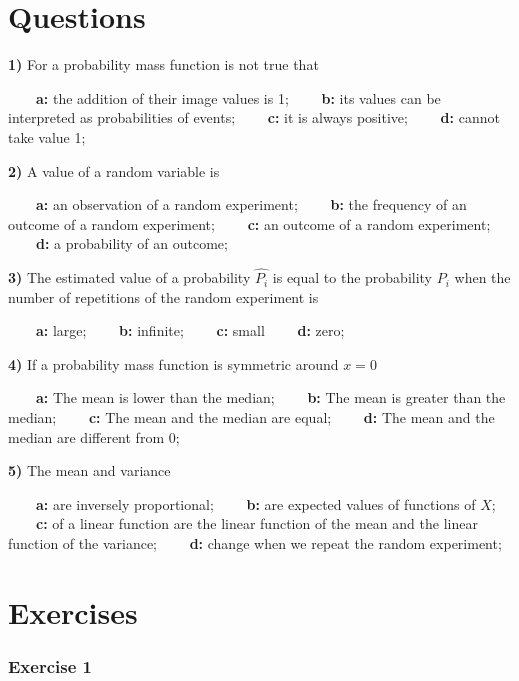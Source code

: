\documentclass[
]{book}
\begin{document}
\hypertarget{questions-3}{%
\section{Questions}\label{questions-3}}

\textbf{1)} For a probability mass function is not true that

\textbf{\(\qquad\)a:} the addition of their image values is 1; \textbf{\(\qquad\)b:} its values can be interpreted as probabilities of events;
\textbf{\(\qquad\)c:} it is always positive;
\textbf{\(\qquad\)d:} cannot take value 1;

\textbf{2)} A value of a random variable is

\textbf{\(\qquad\)a:} an observation of a random experiment; \textbf{\(\qquad\)b:} the frequency of an outcome of a random experiment;
\textbf{\(\qquad\)c:} an outcome of a random experiment;
\textbf{\(\qquad\)d:} a probability of an outcome;

\textbf{3)} The estimated value of a probability \(\hat{P_i}\) is equal to the probability \(P_i\) when the number of repetitions of the random experiment is

\textbf{\(\qquad\)a:} large; \textbf{\(\qquad\)b:} infinite;
\textbf{\(\qquad\)c:} small
\textbf{\(\qquad\)d:} zero;

\textbf{4)} If a probability mass function is symmetric around \(x=0\)

\textbf{\(\qquad\)a:} The mean is lower than the median; \textbf{\(\qquad\)b:} The mean is greater than the median;
\textbf{\(\qquad\)c:} The mean and the median are equal;
\textbf{\(\qquad\)d:} The mean and the median are different from 0;

\textbf{5)} The mean and variance

\textbf{\(\qquad\)a:} are inversely proportional; \textbf{\(\qquad\)b:} are expected values of functions of \(X\);
\textbf{\(\qquad\)c:} of a linear function are the linear function of the mean and the linear function of the variance;
\textbf{\(\qquad\)d:} change when we repeat the random experiment;

\hypertarget{exercises-3}{%
\section{Exercises}\label{exercises-3}}

\hypertarget{exercise-1-2}{%
\subsubsection{Exercise 1}\label{exercise-1-2}}
\end{document}
